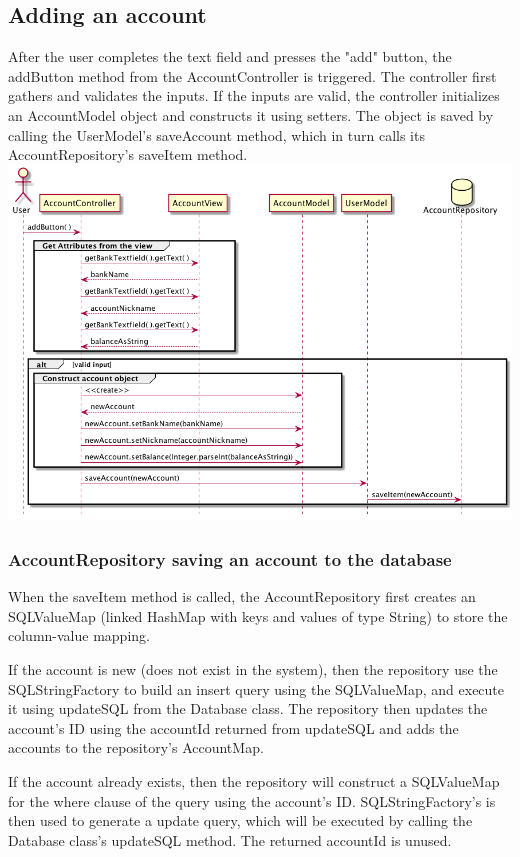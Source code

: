\documentclass[12pt]{article}
\begin{document}
\subsection{Adding an account}
After the user completes the text field and presses the "add" button, the addButton method from the AccountController is triggered. The controller first gathers and validates the inputs. If the inputs are valid, the controller initializes an AccountModel object and constructs it using setters. The object is saved by calling the UserModel's saveAccount method, which in turn calls its AccountRepository's saveItem method. 
\includegraphics[width=\textwidth,height=\textheight,keepaspectratio]{diagrams/sequence/addAccount.png}

\newpage
\subsubsection{AccountRepository saving an account to the database}
When the saveItem method is called, the AccountRepository first creates an SQLValueMap (linked HashMap with keys and values of type String) to store the column-value mapping.

If the account is new (does not exist in the system), then the repository use the SQLStringFactory to build an insert query using the SQLValueMap, and execute it using updateSQL from the Database class. The repository then updates the account's ID using the accountId returned from updateSQL and adds the accounts to the repository's AccountMap.

If the account already exists, then the repository will construct a SQLValueMap for the where clause of the query using the account's ID. SQLStringFactory's is then used to generate a update query, which will be executed by calling the Database class's updateSQL method. The returned accountId is unused.
\end{document}
